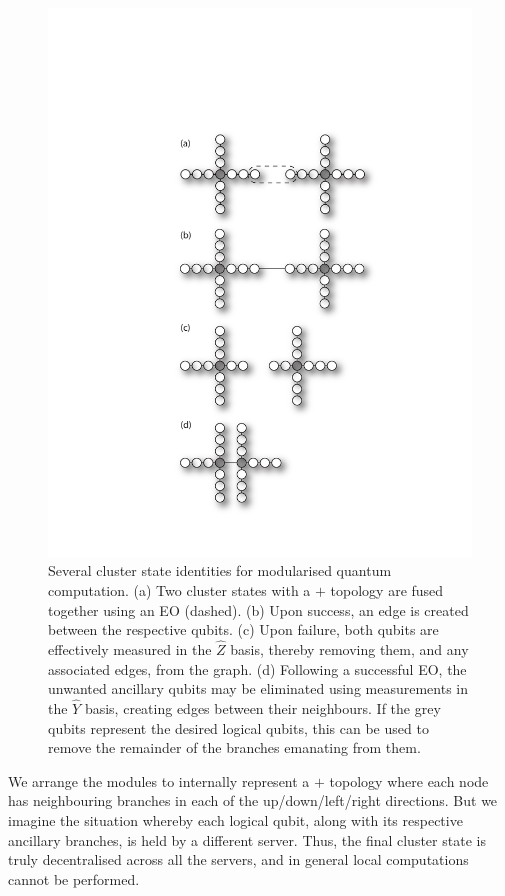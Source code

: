 \documentclass[aps,rmp,twocolumn,amsmath,amssymb,nofootinbib,superscriptaddress,longbibliography,floatfix]{revtex4-1}
\begin{document}
\begin{figure}[!htb]
\includegraphics[width=0.9\columnwidth]{cluster_ident}
\caption{Several cluster state identities for modularised quantum computation. (a) Two cluster states with a $+$ topology are fused together using an EO (dashed). (b) Upon success, an edge is created between the respective qubits. (c) Upon failure, both qubits are effectively measured in the $\hat{Z}$ basis, thereby removing them, and any associated edges, from the graph. (d) Following a successful EO, the unwanted ancillary qubits may be eliminated using measurements in the $\hat{Y}$ basis, creating edges between their neighbours. If the grey qubits represent the desired logical qubits, this can be used to remove the remainder of the branches emanating from them.} \label{fig:plus_cluster_ident}
\end{figure}

We arrange the modules to internally represent a $+$ topology where each node has neighbouring branches in each of the up/down/left/right directions. But we imagine the situation whereby each logical qubit, along with its respective ancillary branches, is held by a different server. Thus, the final cluster state is truly decentralised across all the servers, and in general local computations cannot be performed.
\end{document}
